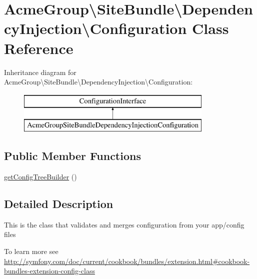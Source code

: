 \hypertarget{class_acme_group_1_1_site_bundle_1_1_dependency_injection_1_1_configuration}{\section{Acme\+Group\textbackslash{}Site\+Bundle\textbackslash{}Dependency\+Injection\textbackslash{}Configuration Class Reference}
\label{class_acme_group_1_1_site_bundle_1_1_dependency_injection_1_1_configuration}
}
Inheritance diagram for Acme\+Group\textbackslash{}Site\+Bundle\textbackslash{}Dependency\+Injection\textbackslash{}Configuration\+:\begin{figure}[H]
\begin{center}
\leavevmode
\includegraphics[height=2.000000cm]{class_acme_group_1_1_site_bundle_1_1_dependency_injection_1_1_configuration}
\end{center}
\end{figure}
\subsection*{Public Member Functions}
\begin{DoxyCompactItemize}
\item 
\hyperlink{class_acme_group_1_1_site_bundle_1_1_dependency_injection_1_1_configuration_a7007b050d4f8d9a87813d365408329c8}{get\+Config\+Tree\+Builder} ()
\end{DoxyCompactItemize}


\subsection{Detailed Description}
This is the class that validates and merges configuration from your app/config files

To learn more see \hyperlink{}{http\+://symfony.\+com/doc/current/cookbook/bundles/extension.\+html\#cookbook-\/bundles-\/extension-\/config-\/class} 

